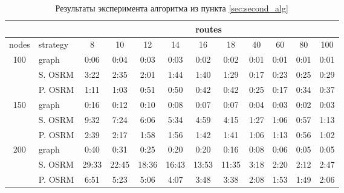 \begin{table*}[h!]
    \centering
    \caption{Результаты эксперимента алгоритма из пункта \ref{sec:second_alg}}
    \label{tab:second_alg}
    \small
    \begin{tabular}{|c|l|c|c|c|c|c|c|l|l|l|c|}
        \hline
        \multicolumn{1}{|l|}{}      &          & \multicolumn{10}{c|}{routes}                                                                                                       \\ \hline
        \multicolumn{1}{|l|}{nodes} & strategy & 8     & 10    & 12    & 14    & 16    & 18    & \multicolumn{1}{c|}{40} & \multicolumn{1}{c|}{60} & \multicolumn{1}{c|}{80} & 100  \\ \hline
        \multirow{3}{*}{100}        & graph    & 0:06  & 0:04  & 0:03  & 0:03  & 0:02  & 0:02  & 0:01                    & 0:01                    & 0:01                    & 0:01 \\ \cline{2-12} 
        & S. OSRM  & 3:22  & 2:35  & 2:01  & 1:44  & 1:40  & 1:29  & 0:17                    & 0:23                    & 0:25                    & 0:29 \\ \cline{2-12} 
        & P. OSRM  & 1:11  & 1:03  & 0:51  & 0:50  & 0:42  & 0:42  & 0:25                    & 0:17                    & 0:34                    & 0:37 \\ \hline
        \multirow{3}{*}{150}        & graph    & 0:16  & 0:12  & 0:10  & 0:08  & 0:07  & 0:07  & 0:04                    & 0:03                    & 0:02                    & 0:03 \\ \cline{2-12} 
        & S. OSRM  & 9:32  & 7:24  & 6:06  & 5:34  & 4:59  & 4:15  & 1:27                    & 1:06                    & 0:57                    & 1:13 \\ \cline{2-12} 
        & P. OSRM  & 2:39  & 2:17  & 1:58  & 1:56  & 1:42  & 1:41  & 1:06                    & 1:13                    & 0:56                    & 1:02 \\ \hline
        \multirow{3}{*}{200}        & graph    & 0:40  & 0:31  & 0:25  & 0:20  & 0:20  & 0:16  & 0:08                    & 0:06                    & 0:05                    & 0:05 \\ \cline{2-12} 
        & S. OSRM  & 29:33 & 22:45 & 18:36 & 16:43 & 13:53 & 11:35 & 3:18                    & 2:20                    & 2:12                    & 2:47 \\ \cline{2-12} 
        & P. OSRM  & 6:51  & 5:23  & 5:06  & 4:07  & 3:48  & 3:38  & 2:08                    & 1:53                    & 1:49                    & 2:06 \\ \hline

\end{tabular}
\end{table*}
